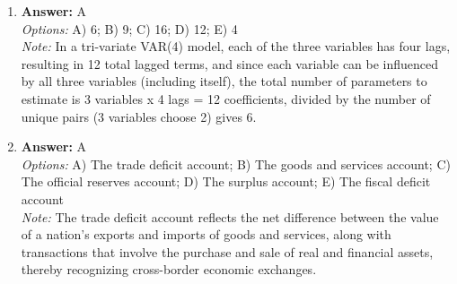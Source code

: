 \documentclass[12pt]{article}
\begin{document}
\begin{enumerate}[label=\arabic*.]
\\ \textit{Note:} The principle of comparative advantage applies not only to international trade but also to any situation where different producers or entities can benefit from specializing in the production of goods or services for which they have the lowest opportunity cost, thereby increasing overall efficiency and output.
\item \textbf{Answer:} A
\\ \textit{Options:} A) 6; B) 9; C) 16; D) 12; E) 4
\\ \textit{Note:} In a tri-variate VAR(4) model, each of the three variables has four lags, resulting in 12 total lagged terms, and since each variable can be influenced by all three variables (including itself), the total number of parameters to estimate is 3 variables x 4 lags = 12 coefficients, divided by the number of unique pairs (3 variables choose 2) gives 6.
\item \textbf{Answer:} A
\\ \textit{Options:} A) The trade deficit account; B) The goods and services account; C) The official reserves account; D) The surplus account; E) The fiscal deficit account
\\ \textit{Note:} The trade deficit account reflects the net difference between the value of a nation's exports and imports of goods and services, along with transactions that involve the purchase and sale of real and financial assets, thereby recognizing cross-border economic exchanges.
\end{enumerate}
\end{document}
